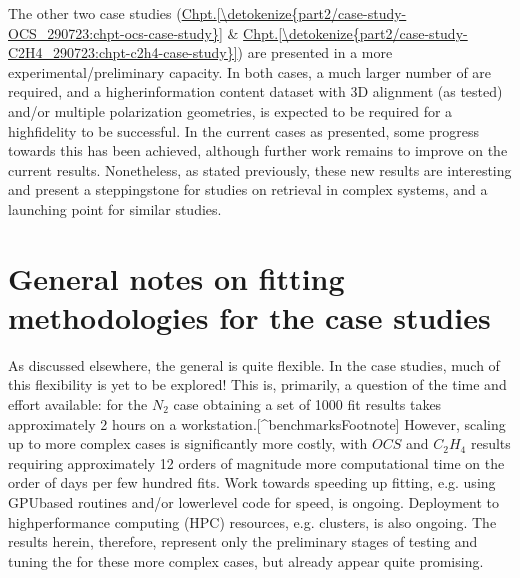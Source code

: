 \documentclass[letterpaper,table,10pt,english]{jupyterBook}
\begin{document}
\sphinxAtStartPar
The other two case studies (\hyperref[\detokenize{part2/case-study-OCS_290723:chpt-ocs-case-study}]{Chpt.\@ \ref{\detokenize{part2/case-study-OCS_290723:chpt-ocs-case-study}}} \& \hyperref[\detokenize{part2/case-study-C2H4_290723:chpt-c2h4-case-study}]{Chpt.\@ \ref{\detokenize{part2/case-study-C2H4_290723:chpt-c2h4-case-study}}}) are presented in a more experimental/preliminary capacity. In both cases, a much larger number of {\hyperref[\detokenize{backmatter/glossary:term-radial-matrix-elements}]{}} are required, and a higher\sphinxhyphen{}information content dataset with 3D alignment (as tested) and/or multiple polarization geometries, is expected to be required for a high\sphinxhyphen{}fidelity {\hyperref[\detokenize{backmatter/glossary:term-bootstrap-retrieval-protocol}]{}} to be successful. In the current cases as presented, some progress towards this has been achieved, although further work remains to improve on the current results. Nonetheless, as stated previously, these new results are interesting and present a stepping\sphinxhyphen{}stone for studies on {\hyperref[\detokenize{backmatter/glossary:term-radial-matrix-elements}]{}} retrieval in complex systems, and a launching point for similar studies.


\section{General notes on fitting methodologies for the case studies}
\label{\detokenize{part2/case-study-summaries_240723:general-notes-on-fitting-methodologies-for-the-case-studies}}
\sphinxAtStartPar
As discussed elsewhere, the general {\hyperref[\detokenize{backmatter/glossary:term-bootstrap-retrieval-protocol}]{}} is quite flexible. In the case studies, much of this flexibility is yet to be explored! This is, primarily, a question of the time and effort available: for the \(N_2\) case obtaining a set of 1000 fit results takes approximately 2 hours on a workstation.{[}\textasciicircum{}benchmarksFootnote{]} However, scaling up to more complex cases is significantly more costly, with \(OCS\) and \(C_2H_4\) results requiring approximately 1\sphinxhyphen{}2 orders of magnitude more computational time \sphinxhyphen{} on the order of days per few hundred fits. Work towards speeding up fitting, e.g. using GPU\sphinxhyphen{}based routines and/or lower\sphinxhyphen{}level code for speed, is ongoing. Deployment to high\sphinxhyphen{}performance computing (HPC) resources, e.g. clusters, is also ongoing. The results herein, therefore, represent only the preliminary stages of testing and tuning the {\hyperref[\detokenize{backmatter/glossary:term-bootstrap-retrieval-protocol}]{}} for these more complex cases, but already appear quite promising.
\end{document}
